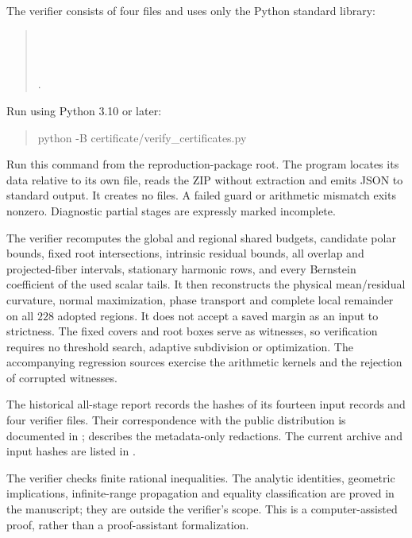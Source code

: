 \begin{samepage}
The verifier consists of four files and uses only the Python standard
library:
\begin{quote}\small
{}\\
\\
\\
.
\end{quote}
\end{samepage}
\begin{samepage}
Run using Python 3.10 or later:
\begin{quote}\ttfamily\small
python -B certificate/verify\_certificates.py
\end{quote}
\end{samepage}
Run this command from the reproduction-package root. The program locates
its data relative to its own file, reads the ZIP without extraction and
emits JSON to standard output. It creates no files. A failed
guard or arithmetic mismatch exits nonzero. Diagnostic partial stages
are expressly marked incomplete.

The verifier recomputes the global and regional shared budgets,
candidate polar bounds, fixed root intersections, intrinsic residual
bounds, all overlap and projected-fiber intervals, stationary harmonic
rows, and every Bernstein coefficient of the used scalar tails. It then
reconstructs the physical mean/residual curvature, normal maximization,
phase transport and complete local remainder on all $228$ adopted
regions. It does not accept a saved margin as an input to strictness.
The fixed covers and root boxes serve as witnesses, so verification
requires no threshold search, adaptive subdivision or optimization.
The accompanying regression sources exercise the
arithmetic kernels and the rejection of corrupted witnesses.

The historical all-stage report
 records the hashes of its
fourteen input records and four verifier files. Their correspondence
with the public distribution is documented in
;
 describes the metadata-only redactions.
The current archive and input hashes are listed in .

The verifier checks finite rational inequalities. The analytic
identities, geometric implications, infinite-range propagation and
equality classification are proved in the manuscript; they are outside
the verifier's scope. This is a computer-assisted proof, rather than a
proof-assistant formalization.
